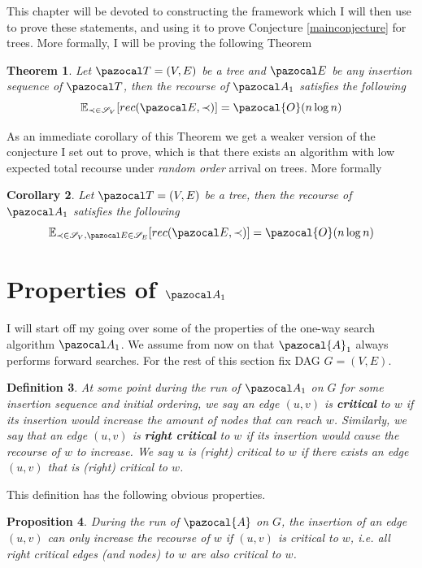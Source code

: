 \documentclass{report}
\newtheorem{theorem}{Theorem}[section]
\newtheorem{corollary}[theorem]{Corollary}
\newtheorem{proposition}[theorem]{Proposition}
\newtheorem{definition}[theorem]{Definition}
\begin{document}
This chapter will be devoted to constructing the framework which I will then use to prove these statements, and using it to prove Conjecture \ref{mainconjecture} for trees. More formally, I will be proving the following Theorem

\begin{theorem}
Let $\pazocal T = (V,E)$ be a tree and $\pazocal E$ be any insertion sequence of $\pazocal T$, then the recourse of $\pazocal A_1$ satisfies the following
\[ \mathbb{E}_{\prec \in \mathcal S_V}[ rec(\pazocal E, \prec)] = \pazocal{O}(n\log n) \]
\end{theorem}

As an immediate corollary of this Theorem we get a weaker version of the conjecture I set out to prove, which is that there exists an algorithm with low expected total recourse under \textit{random order} arrival on trees. More formally

\begin{corollary}
Let $\pazocal T = (V,E)$ be a tree, then the recourse of $\pazocal A_1$ satisfies the following
\[ \mathbb{E}_{\prec \in \mathcal S_V, \pazocal E \in \mathcal S_E}[ rec(\pazocal E, \prec)] = \pazocal{O}(n\log n) \]
\end{corollary}

\section{Properties of $\pazocal A_1$}

I will start off my going over some of the properties of the one-way search algorithm $\pazocal A_1$. We assume from now on that $\pazocal{A}_1$ always performs forward searches. For the rest of this section fix DAG $G=(V,E)$.

\begin{definition}
At some point during the run of $\pazocal A_1$ on $G$ for some insertion sequence and initial ordering, we say an edge $(u,v)$ is \textbf{critical} to $w$ if its insertion would increase the amount of nodes that can reach $w$. Similarly, we say that an edge $(u,v)$ is \textbf{right critical} to $w$ if its insertion would cause the recourse of $w$ to increase. We say $u$ is (right) critical to $w$ if there exists an edge $(u,v)$ that is (right) critical to $w$.
\end{definition}

This definition has the following obvious properties.

\begin{proposition}
During the run of $\pazocal{A}$ on $G$, the insertion of an edge $(u,v)$ can only increase the recourse of $w$ if $(u,v)$ is critical to $w$, i.e. all right critical edges (and nodes) to $w$ are also critical to $w$.
\end{proposition}
\end{document}
